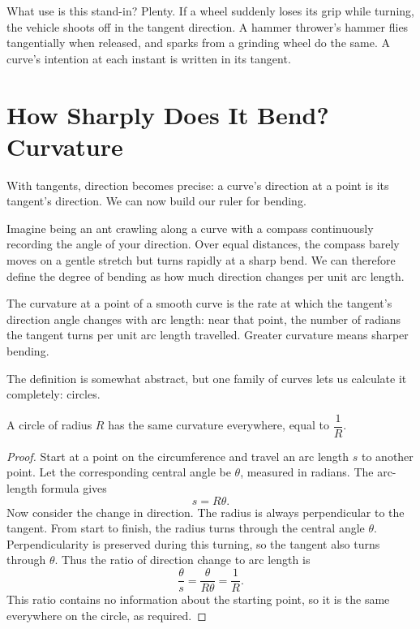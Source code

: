 What use is this stand-in? Plenty. If a wheel suddenly loses its grip while turning, the vehicle shoots off in the tangent direction. A hammer thrower's hammer flies tangentially when released, and sparks from a grinding wheel do the same. A curve's intention at each instant is written in its tangent.

\section{How Sharply Does It Bend? Curvature}

With tangents, direction becomes precise: a curve's direction at a point is its tangent's direction. We can now build our ruler for bending.

Imagine being an ant crawling along a curve with a compass continuously recording the angle of your direction. Over equal distances, the compass barely moves on a gentle stretch but turns rapidly at a sharp bend. We can therefore define the degree of bending as how much direction changes per unit arc length.

\begin{dingyi}
The curvature at a point of a smooth curve is the rate at which the tangent's direction angle changes with arc length: near that point, the number of radians the tangent turns per unit arc length travelled. Greater curvature means sharper bending.
\end{dingyi}

The definition is somewhat abstract, but one family of curves lets us calculate it completely: circles.

\begin{dingli}
A circle of radius $R$ has the same curvature everywhere, equal to $\dfrac{1}{R}$.
\end{dingli}

\begin{proof}
Start at a point on the circumference and travel an arc length $s$ to another point. Let the corresponding central angle be $\theta$, measured in radians. The arc-length formula gives
\[
s = R\theta.
\]
Now consider the change in direction. The radius is always perpendicular to the tangent. From start to finish, the radius turns through the central angle $\theta$. Perpendicularity is preserved during this turning, so the tangent also turns through $\theta$. Thus the ratio of direction change to arc length is
\[
\frac{\theta}{s} = \frac{\theta}{R\theta} = \frac{1}{R}.
\]
This ratio contains no information about the starting point, so it is the same everywhere on the circle, as required.
\end{proof}

